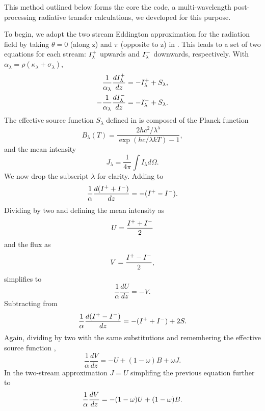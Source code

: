 This method outlined below forms the core the  code, a multi-wavelength post-processing radiative transfer calculations, we developed for this purpose.

\label{sec:Feautrier-method}

To begin, we adopt the two stream Eddington approximation for the radiation field by taking $\theta = 0$ (along z) and $\pi$ (opposite to z) in .
This leads to a set of two equations for each stream: $I^+_\lambda$ upwards and $I^-_\lambda$ downwards, respectively.
With $\alpha_\lambda = \rho(\kappa_\lambda + \sigma_\lambda)$,
\begin{align} 
    \frac{1}{\alpha_\lambda}\frac{dI^+_\lambda}{dz} &= -I^+_\lambda + S_\lambda \label{eqn:dIpdz}, \\
    -\frac{1}{\alpha_\lambda}\frac{dI^-_\lambda}{dz} &= -I^-_\lambda + S_\lambda. \label{eqn:dImdz}
\end{align}
The effective source function $S_\lambda$ defined in  is composed of the Planck function
\begin{equation}
    B_{\lambda}(T) = \frac{2hc^2/\lambda^5}{\exp(hc/\lambda k T) - 1},
\end{equation}
and the mean intensity
\begin{equation}
    J_\lambda = \frac{1}{4\pi}\int I_\lambda d\Omega.
\end{equation}
We now drop the subscript $\lambda$ for clarity.
Adding  to 
\begin{equation}\label{eqn:dIdz}
    \frac{1}{\alpha}\frac{d(I^+ + I^-)}{dz} = - (I^+ - I^-).
\end{equation}
Dividing by two and defining the mean intensity as 
\begin{equation}
    U = \frac{I^+ + I^-}{2}
\end{equation}
and the flux as
\begin{equation}
    V = \frac{I^+ - I^-}{2},
\end{equation}
 simplifies to
\begin{equation}\label{eqn:dUdz=-V}
    \frac{1}{\alpha}\frac{dU}{dz} = -V.
\end{equation}
Subtracting  from 
\begin{equation}
    \frac{1}{\alpha}\frac{d(I^+ - I^-)}{dz} = - (I^+ + I^-) + 2S.
\end{equation}
Again, dividing by two with the same substitutions and remembering the effective source function ,
\begin{equation}
    \frac{1}{\alpha}\frac{dV}{dz} = -U + (1-\omega) B + \omega J.
\end{equation}
In the two-stream approximation $J=U$ simplifing the previous equation further to
\begin{equation}
    \frac{1}{\alpha}\frac{dV}{dz} = -(1-\omega) U + (1-\omega) B. \\
\end{equation}

